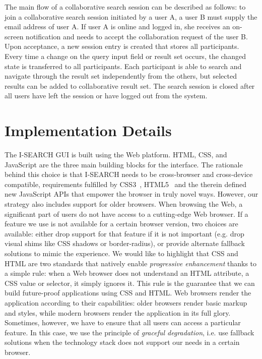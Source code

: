 \documentclass[runningheads,a4paper]{llncs} \usepackage[utf8]{inputenc}
\begin{document}
The main flow of a collaborative search session can be described as follows: to join a collaborative search session initiated by a user A, a user B must supply the email address of user A. If user A is online and logged in, she receives an on-screen notification and needs to accept the collaboration request of the user B. Upon acceptance, a new session entry is created that stores all participants. Every time a change on the query input field or result set occurs, the changed state is transferred to all participants. Each participant is able to search and navigate through the result set independently from the others, but selected results can be added to collaborative result set. The search session is closed after all users have left the session or have logged out from the system.

\section{Implementation Details}
The \mbox{I-SEARCH} GUI is built using the Web platform. HTML, CSS, and JavaScript are the three main building blocks for the interface. The rationale behind this choice is that \mbox{I-SEARCH} needs to be cross-browser and cross-device compatible, requirements fulfilled by CSS3~\cite{css3}, HTML5~\cite{html5} and the therein defined new JavaScript APIs that empower the browser in truly novel ways. However, our strategy also includes support for older browsers. When browsing the Web, a significant part of users do not have access to a cutting-edge Web browser. If a feature we use is not available for a certain browser version, two choices are available: either drop support for that feature if it is not important (e.g. drop visual shims like CSS shadows or border-radius), or provide alternate fallback solutions to mimic the experience. We would like to highlight that CSS and HTML are two standards that natively enable \emph{progressive enhancement} thanks to a simple rule: when a Web browser does not understand an HTML attribute, a CSS value or selector, it simply ignores it. This rule is the guarantee that we can build future-proof applications using CSS and HTML. Web browsers render the application according to their capabilities: older browsers render basic markup and styles, while modern browsers render the application in its full glory. Sometimes, however, we have to ensure that all users can access a particular feature. In this case, we use the principle of \emph{graceful degradation}, i.e. use fallback solutions when the technology stack does not support our needs in a certain browser.
\end{document}
